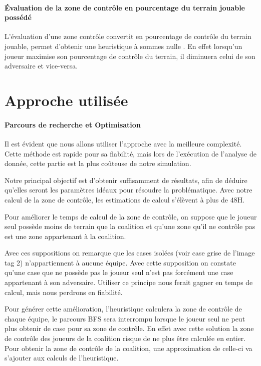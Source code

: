 \paragraph{Évaluation de la zone de contrôle en pourcentage du terrain jouable
possédé}
L'évaluation d'une zone contrôle convertit en pourcentage de
contrôle du terrain jouable, permet d'obtenir une heuristique à sommes nulle
. En effet lorsqu'un joueur maximise son pourcentage de contrôle du terrain,
il diminuera celui de son adversaire et vice-versa.

\section{Approche utilisée}

\paragraph{ Parcours de recherche et Optimisation}
Il est évident que nous allons utiliser l'approche avec la meilleure
complexité. Cette méthode est rapide pour sa fiabilité, mais lors de
l'exécution de l'analyse de donnée, cette partie est la plus coûteuse de 
notre simulation.

Notre principal objectif est d'obtenir suffisamment de résultats,
afin de déduire qu’elles seront les paramètres idéaux pour résoudre la
problématique. Avec notre calcul de la zone de contrôle, les estimations de
calcul s'élèvent à plus de 48H.

Pour améliorer le temps de calcul de la zone de contrôle, on
suppose que le joueur seul possède moins de terrain que la coalition et
qu'une zone qu'il ne contrôle pas est une zone appartenant à la coalition.

Avec ces suppositions on remarque que les cases isolées (voir case 
grise de l'image tag 2) n'appartiennent à aucune équipe. Avec cette
supposition on constate qu'une case que ne possède pas le joueur seul n'est
pas forcément une case appartenant à son adversaire. Utiliser ce principe
nous ferait gagner en temps de calcul, mais nous perdrons en fiabilité.

Pour générer cette amélioration, l'heuristique calculera la zone de 
contrôle de chaque équipe, le parcours BFS sera interrompu lorsque le
joueur seul ne peut plus obtenir de case pour sa zone de contrôle. En effet
avec cette solution la zone de contrôle des joueurs de la coalition risque
de ne plus être calculée en entier. Pour obtenir la zone de contrôle de la
coalition, une approximation de celle-ci va s'ajouter aux calculs de
l'heuristique. 

